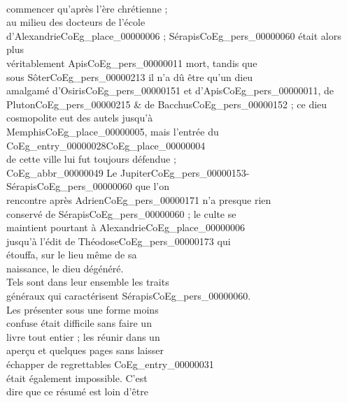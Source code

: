 \documentclass{book}
\begin{document}
{\begin{paracol}{2}
\noindent \\
\switchcolumn
\noindent commencer qu’après l’ère chrétienne ;\\
au milieu des docteurs de l’école\\
d’Alexandrie\gls{CoEg_place_00000006} ; Sérapis\gls{CoEg_pers_00000060} était alors plus\\
véritablement Apis\gls{CoEg_pers_00000011} mort, tandis que\\
sous Sôter\gls{CoEg_pers_00000213} il n’a dû être qu’un dieu\\
amalgamé d’Osiris\gls{CoEg_pers_00000151} et d’Apis\gls{CoEg_pers_00000011}, de\\
Pluton\gls{CoEg_pers_00000215} \& de Bacchus\gls{CoEg_pers_00000152} ; ce dieu\\
cosmopolite eut des autels jusqu’à\\
Memphis\gls{CoEg_place_00000005}, mais l’entrée du \Gls{CoEg_entry_00000028}\gls{CoEg_place_00000004}\\
de cette ville lui fut toujours défendue ;\\
\indent \gls{CoEg_abbr_00000049} Le Jupiter\gls{CoEg_pers_00000153}-Sérapis\gls{CoEg_pers_00000060} que l’on\\
rencontre après Adrien\gls{CoEg_pers_00000171} n’a presque rien\\
conservé de Sérapis\gls{CoEg_pers_00000060} ; le culte se\\
maintient pourtant à Alexandrie\gls{CoEg_place_00000006}\\
jusqu’à l’édit de Théodose\gls{CoEg_pers_00000173} qui\\
étouffa, sur le lieu même de sa\\
naissance, le dieu dégénéré.\\
\indent Tels sont dans leur ensemble les traits\\
généraux qui caractérisent Sérapis\gls{CoEg_pers_00000060}.\\
Les présenter sous une forme moins\\
confuse était difficile sans faire un\\
livre tout entier ; les réunir dans un\\
aperçu et quelques pages sans laisser\\
échapper de regrettables \gls{CoEg_entry_00000031}\\
était également impossible. C’est\\
dire que ce résumé est loin d’être\\

\end{paracol}}
\end{document}
